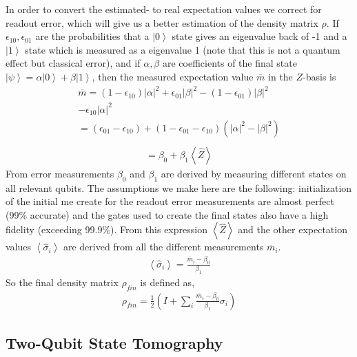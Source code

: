 In order to convert the estimated- to real expectation values we correct for readout error, which will give us a better estimation of the density matrix $\rho$. If $\epsilon_{10},\epsilon_{01}$ are the probabilities that a $\left|0\right\rangle$ state gives an eigenvalue back of -1 and a $\left|1\right\rangle$ state which is measured as a eigenvalue 1 (note that this is not a quantum effect but classical error), and if $\alpha,\beta$ are coefficients of the final state $\left|\psi\right\rangle=\alpha\left|0\right\rangle+\beta\left|1\right\rangle$, then the measured expectation value $\overline{m}$ in the $Z$-basis is
\begin{equation*}
\begin{split}
\overline{m} =\left(1-\epsilon_{10}\right)\left|\alpha\right|^2+\epsilon_{01}\left|\beta\right|^2-\left(1-\epsilon_{01}\right)\left|\beta\right|^2\\
-\epsilon_{10}\left|\alpha\right|^2\\=\left(\epsilon_{01}-\epsilon_{10}\right)+\left(1-\epsilon_{01}-\epsilon_{10}\right)\left(\left|\alpha\right|^2-\left|\beta\right|^2\right)\\
\end{split}
\end{equation*}
\begin{equation}
\begin{split}
=\beta_0+\beta_1\left\langle \hat{Z}\right\rangle
\end{split}
\end{equation}
From error measurements $\beta_0$ and $\beta_1$ are derived by measuring different states on all relevant qubits. The assumptions we make here are the following: initialization of the initial me create for the readout error measurements are almost perfect (99\% accurate) and the gates used to create the final states also have a high fidelity (exceeding 99.9\%).
From this expression $\left\langle \hat{Z}\right\rangle$ and the other expectation values $\left\langle \hat{\sigma}_i\right\rangle$ are derived from all the different measurements $\overline{m}_i$.
\begin{equation}
\begin{split}
\left\langle \hat{\sigma}_i\right\rangle=\frac{\overline{m}_i-\beta_0}{\beta_1}
\end{split}
\end{equation}
So the final density matrix $\rho_{fin}$ is defined as,
\begin{equation}
\begin{split}
\rho_{fin}=\frac{1}{2}\left(I+\sum_i\frac{\overline{m}_i-\beta_0}{\beta_1}\sigma_i\right)
\end{split}
\end{equation}
\newpage
\subsection{Two-Qubit State Tomography}

  